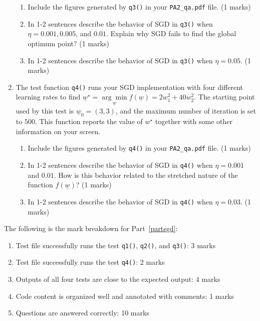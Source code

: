 \documentclass{article}
\theoremstyle{definition}
\begin{document}
\begin{enumerate}[label=\ref{partsgd}.\alph*]
	\begin{enumerate}[label=\ref{b1b1b}.\roman*]
		\item Include the figures generated by \verb|q3()| in your \verb|PA2_qa.pdf| file. (1 marks)
		\item In 1-2 sentences describe the behavior of SGD in \verb|q3()| when $\eta=0.001, 0.005$, and $0.01$. Explain why SGD fails to find the global optimum point? (1 marks)
		\item In 1-2 sentences describe the behavior of SGD in \verb|q3()| when $\eta=0.05$. (1 marks)
	\end{enumerate}
	\item \label{c1c1c}The test function \verb|q4()| runs your SGD implementation with four different learning rates to find $\underline{w}^\star = \underset{\underline{w}}{\arg \min} f(\underline{w}) = 2 w_1^2 + 40w_2^2$. The starting point used by this test is $\underline{w}_0=(3,3)$, and the maximum number of iteration is set to $500$. This function reports the value of $w^\star$ together with some other information on your screen.
	\begin{enumerate}[label=\ref{c1c1c}.\roman*]
		\item Include the figures generated by \verb|q4()| in your \verb|PA2_qa.pdf| file. (1 marks)
		\item In 1-2 sentences describe the behavior of SGD in \verb|q4()| when $\eta=0.001$ and $0.01$. How is this behavior related to the stretched nature of the function $f(\underline{w})$? (1 marks)
		\item In 1-2 sentences describe the behavior of SGD in \verb|q4()| when $\eta=0.03$. (1 marks)
	\end{enumerate}
\end{enumerate}
The following is the mark breakdown for Part~\ref{partsgd}:
\begin{enumerate}[label=(\roman*)]
	\item Test file successfully runs the test \verb|q1()|, \verb|q2()|, and \verb|q3()|: 3 marks
	\item Test file successfully runs the test \verb|q4()|: 2 marks
	\item Outputs of all four tests are close to the expected output: 4 marks
	\item Code content is organized well and annotated with comments: 1 marks
	\item Questions are answered correctly: 10 marks
\end{enumerate}
\end{document}
